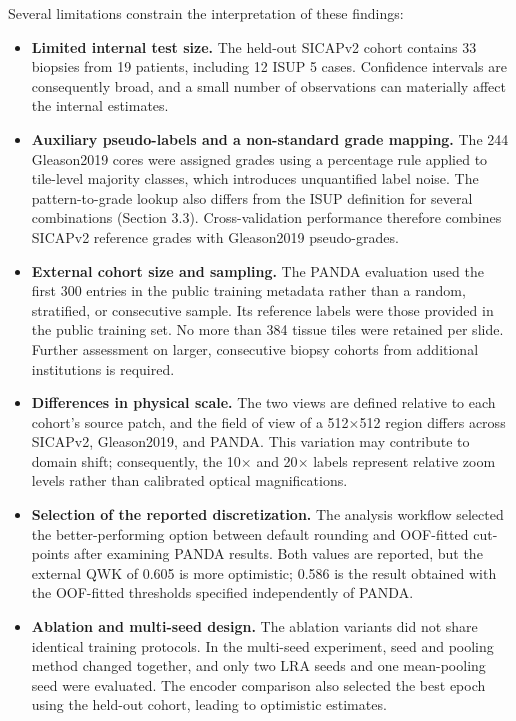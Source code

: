 \documentclass[11pt,a4paper]{article}
\begin{document}
Several limitations constrain the interpretation of these findings:

\begin{itemize}[leftmargin=1.8em, itemsep=3pt, parsep=0pt]
  \item \textbf{Limited internal test size.} The held-out SICAPv2 cohort contains 33 biopsies from 19 patients, including 12 ISUP 5 cases. Confidence intervals are consequently broad, and a small number of observations can materially affect the internal estimates.
  \item \textbf{Auxiliary pseudo-labels and a non-standard grade mapping.} The 244 Gleason2019 cores were assigned grades using a percentage rule applied to tile-level majority classes, which introduces unquantified label noise. The pattern-to-grade lookup also differs from the ISUP definition for several combinations (Section 3.3). Cross-validation performance therefore combines SICAPv2 reference grades with Gleason2019 pseudo-grades.
  \item \textbf{External cohort size and sampling.} The PANDA evaluation used the first 300 entries in the public training metadata rather than a random, stratified, or consecutive sample. Its reference labels were those provided in the public training set. No more than 384 tissue tiles were retained per slide. Further assessment on larger, consecutive biopsy cohorts from additional institutions is required.
  \item \textbf{Differences in physical scale.} The two views are defined relative to each cohort's source patch, and the field of view of a 512$\times$512 region differs across SICAPv2, Gleason2019, and PANDA. This variation may contribute to domain shift; consequently, the 10$\times$ and 20$\times$ labels represent relative zoom levels rather than calibrated optical magnifications.
  \item \textbf{Selection of the reported discretization.} The analysis workflow selected the better-performing option between default rounding and OOF-fitted cut-points after examining PANDA results. Both values are reported, but the external QWK of 0.605 is more optimistic; 0.586 is the result obtained with the OOF-fitted thresholds specified independently of PANDA.
  \item \textbf{Ablation and multi-seed design.} The ablation variants did not share identical training protocols. In the multi-seed experiment, seed and pooling method changed together, and only two LRA seeds and one mean-pooling seed were evaluated. The encoder comparison also selected the best epoch using the held-out cohort, leading to optimistic estimates.

\end{itemize}
\end{document}
